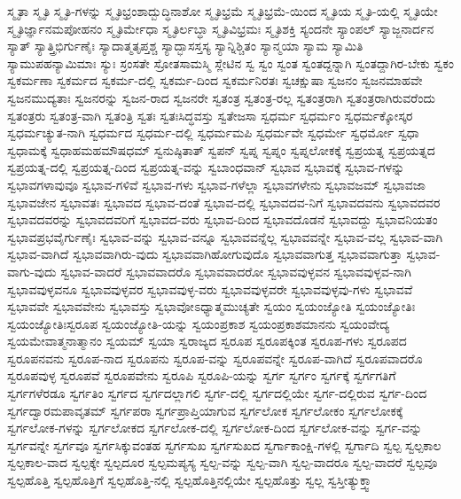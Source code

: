 {ಸ್ಮೃತಾ
ಸ್ಮೃತಿ
ಸ್ಮೃತಿ-ಗಳನ್ನು
ಸ್ಮೃತಿಭ್ರಂಶಾದ್ಬುದ್ಧಿನಾಶೋ
ಸ್ಮೃತಿಭ್ರಮೆ
ಸ್ಮೃತಿಭ್ರಮೆ-ಯಿಂದ
ಸ್ಮೃತಿಯ
ಸ್ಮೃತಿ-ಯಲ್ಲಿ
ಸ್ಮೃತಿಯೇ
ಸ್ಮೃತಿರ್ಜ್ಞಾನಮಪೋಹನಂ
ಸ್ಮೃತಿರ್ಮೇಧಾ
ಸ್ಮೃತಿರ್ಲಬ್ಧಾ
ಸ್ಮೃತಿವಿಭ್ರಮಃ
ಸ್ಮೃತಿಶಕ್ತಿ
ಸ್ಯಂದನೇ
ಸ್ಯಾಂಪಲ್
ಸ್ಯಾಜ್ಜನಾರ್ದನ
ಸ್ಯಾತ್
ಸ್ಯಾತ್ತ್ರಿಭಿರ್ಗುಣೈಃ
ಸ್ಯಾದಾತ್ಮತೃಪ್ತಶ್ಚ
ಸ್ಯಾದ್ಭಾಸಸ್ತಸ್ಯ
ಸ್ಯಾನ್ನಿಶ್ಚಿತಂ
ಸ್ಯಾನ್ಮಯಾ
ಸ್ಯಾಮ
ಸ್ಯಾಮಿತಿ
ಸ್ಯಾಮುಪಹನ್ಯಾಮಿಮಾಃ
ಸ್ಯುಃ
ಸ್ರಂಸತೇ
ಸ್ರೋತಸಾಮಸ್ಮಿ
ಸ್ಲೇಟಿನ
ಸ್ವ
ಸ್ವಂ
ಸ್ವಂತ
ಸ್ವಂತದ್ದನ್ನಾಗಿ
ಸ್ವಂತದ್ದಾಗಿರ-ಬೇಕು
ಸ್ವಕಂ
ಸ್ವಕರ್ಮಣಾ
ಸ್ವಕರ್ಮದ
ಸ್ವಕರ್ಮ-ದಲ್ಲಿ
ಸ್ವಕರ್ಮ-ದಿಂದ
ಸ್ವಕರ್ಮನಿರತಃ
ಸ್ವಚಕ್ಷುಷಾ
ಸ್ವಜನಂ
ಸ್ವಜನಮಾಹವೇ
ಸ್ವಜನಮುದ್ಯತಾಃ
ಸ್ವಜನರನ್ನು
ಸ್ವಜನ-ರಾದ
ಸ್ವಜನರೇ
ಸ್ವತಂತ್ರ
ಸ್ವತಂತ್ರ-ರಲ್ಲ
ಸ್ವತಂತ್ರರಾಗಿ
ಸ್ವತಂತ್ರರಾಗಿರುವರೆಂದು
ಸ್ವತಂತ್ರರು
ಸ್ವತಂತ್ರ-ವಾಗಿ
ಸ್ವತಂತ್ರಿ
ಸ್ವತಃ
ಸ್ವತಃಸಿದ್ಧವಸ್ತು
ಸ್ವತೇಜಸಾ
ಸ್ವಧರ್ಮ
ಸ್ವಧರ್ಮಂ
ಸ್ವಧರ್ಮಕ್ಕೋಸ್ಕರ
ಸ್ವಧರ್ಮಚ್ಯುತ-ನಾಗಿ
ಸ್ವಧರ್ಮದ
ಸ್ವಧರ್ಮ-ದಲ್ಲಿ
ಸ್ವಧರ್ಮಮಪಿ
ಸ್ವಧರ್ಮವೇ
ಸ್ವಧರ್ಮೇ
ಸ್ವಧರ್ಮೋ
ಸ್ವಧಾ
ಸ್ವಧಾಮಕ್ಕೆ
ಸ್ವಧಾಹಮಹಮೌಷಧಮ್
ಸ್ವನುಷ್ಠಿತಾತ್
ಸ್ವಪನ್
ಸ್ವಪ್ನ
ಸ್ವಪ್ನಂ
ಸ್ವಪ್ನಲೋಕಕ್ಕೆ
ಸ್ವಪ್ರಯತ್ನ
ಸ್ವಪ್ರಯತ್ನದ
ಸ್ವಪ್ರಯತ್ನ-ದಲ್ಲಿ
ಸ್ವಪ್ರಯತ್ನ-ದಿಂದ
ಸ್ವಪ್ರಯತ್ನ-ವನ್ನು
ಸ್ವಬಾಂಧವಾನ್
ಸ್ವಭಾವ
ಸ್ವಭಾವಕ್ಕೆ
ಸ್ವಭಾವ-ಗಳನ್ನು
ಸ್ವಭಾವಗಳಾವುವೂ
ಸ್ವಭಾವ-ಗಳಿವೆ
ಸ್ವಭಾವ-ಗಳು
ಸ್ವಭಾವ-ಗಳೆಲ್ಲಾ
ಸ್ವಭಾವಗಳೇನು
ಸ್ವಭಾವಜಮ್
ಸ್ವಭಾವಜಾ
ಸ್ವಭಾವಜೇನ
ಸ್ವಭಾವತಃ
ಸ್ವಭಾವದ
ಸ್ವಭಾವ-ದಂತೆ
ಸ್ವಭಾವ-ದಲ್ಲಿ
ಸ್ವಭಾವದವ-ನಿಗೆ
ಸ್ವಭಾವದವನು
ಸ್ವಭಾವದವರ
ಸ್ವಭಾವದವರನ್ನು
ಸ್ವಭಾವದವರಿಗೆ
ಸ್ವಭಾವದ-ವರು
ಸ್ವಭಾವ-ದಿಂದ
ಸ್ವಭಾವದೊಡನೆ
ಸ್ವಭಾವದ್ದು
ಸ್ವಭಾವನಿಯತಂ
ಸ್ವಭಾವಪ್ರಭವೈರ್ಗುಣೈಃ
ಸ್ವಭಾವ-ವನ್ನು
ಸ್ವಭಾವ-ವನ್ನೂ
ಸ್ವಭಾವವನ್ನೆಲ್ಲ
ಸ್ವಭಾವವನ್ನೇ
ಸ್ವಭಾವ-ವಲ್ಲ
ಸ್ವಭಾವ-ವಾಗಿ
ಸ್ವಭಾವ-ವಾಗಿದೆ
ಸ್ವಭಾವವಾಗಿರು-ವುದು
ಸ್ವಭಾವವಾಗಿಹೋಗುವುದೊ
ಸ್ವಭಾವವಾಗುತ್ತ
ಸ್ವಭಾವವಾಗುತ್ತಾ
ಸ್ವಭಾವ-ವಾಗು-ವುದು
ಸ್ವಭಾವ-ವಾದರೆ
ಸ್ವಭಾವವಾದರೊ
ಸ್ವಭಾವವಾದರೋ
ಸ್ವಭಾವವುಳ್ಳವನ
ಸ್ವಭಾವವುಳ್ಳವ-ನಾಗಿ
ಸ್ವಭಾವವುಳ್ಳವನೂ
ಸ್ವಭಾವವುಳ್ಳವರ
ಸ್ವಭಾವವುಳ್ಳ-ವರು
ಸ್ವಭಾವವುಳ್ಳವರೇ
ಸ್ವಭಾವವುಳ್ಳವು-ಗಳು
ಸ್ವಭಾವವೆ
ಸ್ವಭಾವವೇ
ಸ್ವಭಾವವೇನು
ಸ್ವಭಾವಸ್ತು
ಸ್ವಭಾವೋಽಧ್ಯಾತ್ಮಮುಚ್ಯತೇ
ಸ್ವಯಂ
ಸ್ವಯಂಜ್ಯೋತಿ
ಸ್ವಯಂಜ್ಯೋತಿಃ
ಸ್ವಯಂಜ್ಯೋತಿಃಸ್ವರೂಪ
ಸ್ವಯಂಜ್ಯೋತಿ-ಯನ್ನು
ಸ್ವಯಂಪ್ರಕಾಶ
ಸ್ವಯಂಪ್ರಕಾಶಮಾನನು
ಸ್ವಯಂವೇದ್ಯ
ಸ್ವಯಮೇವಾತ್ಮನಾತ್ಮಾನಂ
ಸ್ವಯಮ್
ಸ್ವಯಾ
ಸ್ವರಾಜ್ಯದ
ಸ್ವರೂಪ
ಸ್ವರೂಪಕ್ಕಿಂತ
ಸ್ವರೂಪ-ಗಳು
ಸ್ವರೂಪದ
ಸ್ವರೂಪನವನು
ಸ್ವರೂಪ-ನಾದ
ಸ್ವರೂಪನು
ಸ್ವರೂಪ-ವನ್ನು
ಸ್ವರೂಪವನ್ನೇ
ಸ್ವರೂಪ-ವಾಗಿದೆ
ಸ್ವರೂಪವಾದರೊ
ಸ್ವರೂಪವುಳ್ಳ
ಸ್ವರೂಪವೆ
ಸ್ವರೂಪವೇನು
ಸ್ವರೂಪಿ
ಸ್ವರೂಪಿ-ಯನ್ನು
ಸ್ವರ್ಗ
ಸ್ವರ್ಗಂ
ಸ್ವರ್ಗಕ್ಕೆ
ಸ್ವರ್ಗಗತಿಗೆ
ಸ್ವರ್ಗಗಳೆರಡೂ
ಸ್ವರ್ಗತಿಂ
ಸ್ವರ್ಗದ
ಸ್ವರ್ಗದಲ್ಲಾಗಲಿ
ಸ್ವರ್ಗ-ದಲ್ಲಿ
ಸ್ವರ್ಗದಲ್ಲಿಯೇ
ಸ್ವರ್ಗ-ದಲ್ಲಿರುವ
ಸ್ವರ್ಗ-ದಿಂದ
ಸ್ವರ್ಗದ್ವಾರಮಪಾವೃತಮ್
ಸ್ವರ್ಗಪರಾ
ಸ್ವರ್ಗಪ್ರಾಪ್ತಿಯಾಗುವ
ಸ್ವರ್ಗಲೋಕ
ಸ್ವರ್ಗಲೋಕಂ
ಸ್ವರ್ಗಲೋಕಕ್ಕೆ
ಸ್ವರ್ಗಲೋಕ-ಗಳನ್ನು
ಸ್ವರ್ಗಲೋಕದ
ಸ್ವರ್ಗಲೋಕ-ದಲ್ಲಿ
ಸ್ವರ್ಗಲೋಕ-ದಿಂದ
ಸ್ವರ್ಗಲೋಕ-ವನ್ನು
ಸ್ವರ್ಗ-ವನ್ನು
ಸ್ವರ್ಗವನ್ನೇ
ಸ್ವರ್ಗವೂ
ಸ್ವರ್ಗಸಿಕ್ಕುವಂತಹ
ಸ್ವರ್ಗಸುಖ
ಸ್ವರ್ಗಸುಖದ
ಸ್ವರ್ಗಾಕಾಂಕ್ಷಿ-ಗಳಲ್ಲಿ
ಸ್ವರ್ಗಾದಿ
ಸ್ವಲ್ಪ
ಸ್ವಲ್ಪಕಾಲ
ಸ್ವಲ್ಪಕಾಲ-ವಾದ
ಸ್ವಲ್ಪಕ್ಕೇ
ಸ್ವಲ್ಪದೂರ
ಸ್ವಲ್ಪಮಪ್ಯಸ್ಯ
ಸ್ವಲ್ಪ-ವನ್ನು
ಸ್ವಲ್ಪ-ವಾಗಿ
ಸ್ವಲ್ಪ-ವಾದರೂ
ಸ್ವಲ್ಪ-ವಾದರೆ
ಸ್ವಲ್ಪವೂ
ಸ್ವಲ್ಪಹೊತ್ತಿ
ಸ್ವಲ್ಪಹೊತ್ತಿಗೆ
ಸ್ವಲ್ಪಹೊತ್ತಿ-ನಲ್ಲಿ
ಸ್ವಲ್ಪಹೊತ್ತಿನಲ್ಲಿಯೇ
ಸ್ವಲ್ಪಹೊತ್ತು
ಸ್ವಲ್ಲ
ಸ್ವಸ್ತೀತ್ಯುಕ್ತ್ವಾ
}
